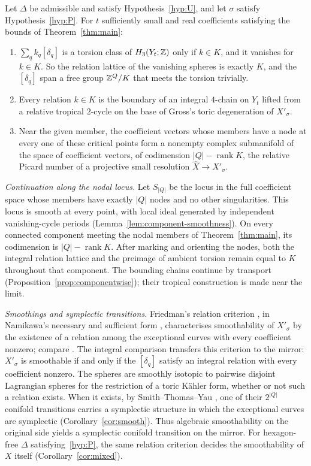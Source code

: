 \begin{theorem*}
Let $\Delta$ be admissible and satisfy Hypothesis~\ref{hyp:U}, and let $\sigma$ satisfy Hypothesis~\ref{hyp:P}. For $t$
sufficiently small and real coefficients satisfying the bounds of Theorem~\ref{thm:main}:
\begin{enumerate}
\item $\sum_qk_q[\delta_q]$ is a torsion class of $H_3(Y_t;\mathbb Z)$ only if $k\in K$, and it vanishes for $k\in K$. So the
relation lattice of the vanishing spheres is exactly $K$, and the $[\delta_q]$ span a free group $\mathbb Z^Q/K$ that meets the
torsion trivially.
\item Every relation $k\in K$ is the boundary of an integral $4$-chain on $Y_t$ lifted from a relative
tropical $2$-cycle on the base of Gross's toric degeneration of $X'_\sigma$.
\item Near the given member, the coefficient vectors whose members have a node at every one of these critical points
form a nonempty complex submanifold of the space of coefficient vectors, of codimension $|Q|-\operatorname{rank}K$, the relative Picard number of a projective small resolution
$\widehat X\to X'_\sigma$.
\end{enumerate}
\end{theorem*}

\emph{Continuation along the nodal locus.} Let $S_{|Q|}$ be the locus in the full coefficient space whose members
have exactly $|Q|$ nodes and no other singularities. This locus is smooth at every point, with local ideal generated
by independent vanishing-cycle periods (Lemma~\ref{lem:component-smoothness}). On every connected component meeting
the nodal members of Theorem~\ref{thm:main}, its codimension is $|Q|-\operatorname{rank}K$.
After marking and orienting the nodes, both the integral relation lattice and the preimage of ambient torsion
remain equal to $K$ throughout that component. The bounding chains continue by transport
(Proposition~\ref{prop:componentwise}); their tropical construction is made near the limit.

\emph{Smoothings and symplectic transitions.} Friedman's relation criterion
\cite[Rem.~(4.5), Cor.~(4.7)]{Friedman}, in Namikawa's necessary and sufficient form \cite[Thm.~2.5]{Nam02},
characterises smoothability of $X'_\sigma$ by the existence of a relation among the exceptional curves with every
coefficient nonzero; compare \cite[Thms.~1.2 and~1.3]{RT09}. The integral comparison transfers this criterion to the mirror:
$X'_\sigma$ is smoothable if and only if the $[\delta_q]$ satisfy an integral relation with every coefficient nonzero.
The spheres are smoothly isotopic to pairwise disjoint Lagrangian spheres for the restriction of a
toric K\"ahler form, whether or not such a relation exists. When it exists, by Smith--Thomas--Yau \cite[Thm.~2.9]{STY},
one of their $2^{|Q|}$ conifold transitions carries a symplectic structure in which the exceptional curves are symplectic (Corollary~\ref{cor:smooth}). Thus algebraic
smoothability on the original side yields a symplectic conifold transition on the mirror. For hexagon-free $\Delta$
satisfying~\ref{hyp:P}, the same relation criterion decides the smoothability of $X$ itself
(Corollary~\ref{cor:mixed}).

